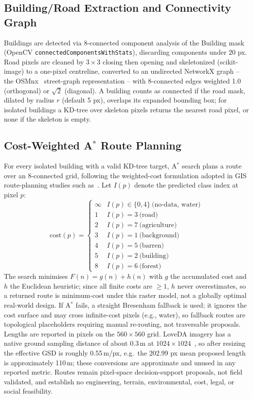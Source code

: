 \documentclass[runningheads]{llncs}
\begin{document}
\subsection{Building/Road Extraction and Connectivity Graph}
Buildings are detected via 8-connected component analysis of the Building mask (OpenCV \texttt{connectedComponentsWithStats}), discarding components under 20 px. Road pixels are cleaned by $3\times3$ closing then opening and skeletonized (scikit-image) to a one-pixel centreline, converted to an undirected NetworkX graph -- the OSMnx~\cite{boeing2017} street-graph representation -- with 8-connected edges weighted 1.0 (orthogonal) or $\sqrt2$ (diagonal). A building counts as connected if the road mask, dilated by radius $r$ (default 5 px), overlaps its expanded bounding box; for isolated buildings a KD-tree over skeleton pixels returns the nearest road pixel, or none if the skeleton is empty.

\subsection{Cost-Weighted A$^{*}$ Route Planning}
For every isolated building with a valid KD-tree target, A$^{*}$ search plans a route over an 8-connected grid, following the weighted-cost formulation adopted in GIS route-planning studies such as~\cite{wang2022astar}. Let $I(p)$ denote the predicted class index at pixel $p$:
\begin{equation}
\mathrm{cost}(p)=\begin{cases}
\infty & I(p)\in\{0,4\}\ \text{(no-data, water)}\\
1 & I(p)=3\ \text{(road)}\\
2 & I(p)=7\ \text{(agriculture)}\\
3 & I(p)=1\ \text{(background)}\\
4 & I(p)=5\ \text{(barren)}\\
5 & I(p)=2\ \text{(building)}\\
8 & I(p)=6\ \text{(forest)}
\end{cases}
\end{equation}
The search minimises $F(n)=g(n)+h(n)$ with $g$ the accumulated cost and $h$ the Euclidean heuristic; since all finite costs are $\ge1$, $h$ never overestimates, so a returned route is minimum-cost under this raster model, not a globally optimal real-world design. If A$^{*}$ fails, a straight Bresenham fallback is used; it ignores the cost surface and may cross infinite-cost pixels (e.g., water), so fallback routes are topological placeholders requiring manual re-routing, not traversable proposals. Lengths are reported in pixels on the $560\times560$ grid. LoveDA imagery has a native ground sampling distance of about $0.3$\,m at $1024\times1024$~\cite{wang2021loveda}, so after resizing the effective GSD is roughly 0.55\,m/px, e.g.\ the 202.99 px mean proposed length is approximately 110\,m; these conversions are approximate and unused in any reported metric. Routes remain pixel-space decision-support proposals, not field validated, and establish no engineering, terrain, environmental, cost, legal, or social feasibility.
\end{document}

